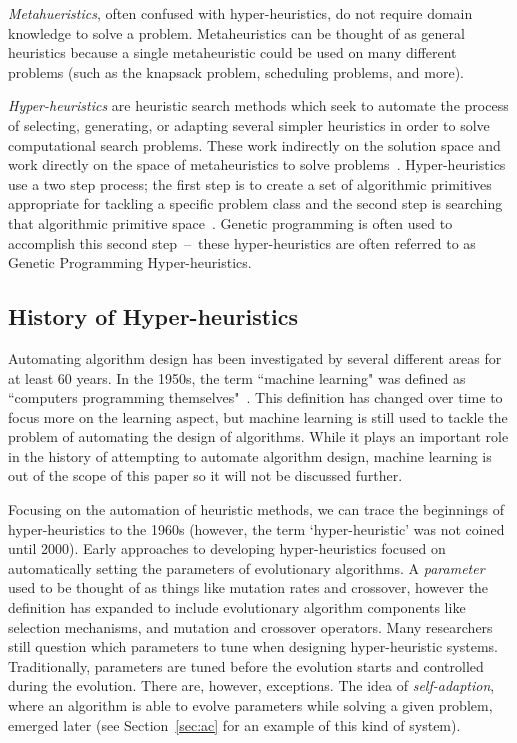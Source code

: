\documentclass{sig-alternate}
\begin{document}
\textit{Metahueristics}, often confused with hyper-heuristics, do not require domain knowledge to solve a problem. Metaheuristics can be thought of as general heuristics because a single metaheuristic could be used on many different problems (such as the knapsack problem, scheduling problems, and more).~\cite{tauritz:tutorial}

\textit{Hyper-heuristics} are heuristic search methods which seek to automate the process of selecting, generating, or adapting several simpler heuristics in order to solve computational search problems. These work indirectly on the solution space and work directly on the space of metaheuristics to solve problems~\cite{tauritz:tutorial}. Hyper-heuristics use a two step process; the first step is to create a set of algorithmic primitives appropriate for tackling a specific problem class and the second step is searching that algorithmic primitive space~\cite{harris:2015}. Genetic programming is often used to accomplish this second step~--~these hyper-heuristics are often referred to as Genetic Programming Hyper-heuristics.

\subsection{History of Hyper-heuristics}
\label{sec:history}
Automating algorithm design has been investigated by several different areas for at least 60 years. In the 1950s, the term ``machine learning" was defined as ``computers programming themselves"~\cite{pappa:2014}. This definition has changed over time to focus more on the learning aspect, but machine learning is still used to tackle the problem of automating the design of algorithms. While it plays an important role in the history of attempting to automate algorithm design, machine learning is out of the scope of this paper so it will not be discussed further.

Focusing on the automation of heuristic methods, we can trace the beginnings of hyper-heuristics to the 1960s (however, the term `hyper-heuristic' was not coined until 2000). Early approaches to developing hyper-heuristics focused on automatically setting the parameters of evolutionary algorithms. A \textit{parameter} used to be thought of as things like mutation rates and crossover, however the definition has expanded to include evolutionary algorithm components like selection mechanisms, and mutation and crossover operators. Many researchers still question which parameters to tune when designing hyper-heuristic systems. Traditionally, parameters are tuned before the evolution starts and controlled during the evolution. There are, however, exceptions. The idea of \textit{self-adaption}, where an algorithm is able to evolve parameters while solving a given problem, emerged later (see Section~\ref{sec:ac} for an example of this kind of system).~\cite{pappa:2014}
\end{document}
